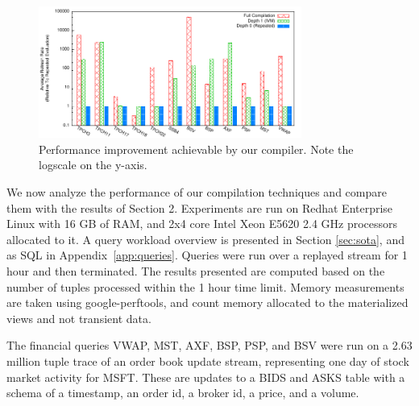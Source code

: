 
\newcommand{\figurewidth}[0]{1.8in}

\newcommand{\tablefig}[1]{
  \hspace*{-0.25in}
  \texttt{[image: ../graphs/graphs/\#1]}
}

\begin{figure}
\begin{center}
\includegraphics[width=3.4in]{../graphs/graphs/bakeoff.pdf}
\caption{Performance improvement achievable by our compiler.  Note the logscale on the y-axis. }
\label{fig:experiments:bakeoff}
\end{center}
\vspace*{-0.3in}
\end{figure}

We now analyze the performance of our compilation techniques and compare them with the results of Section 2.  Experiments are run on Redhat Enterprise Linux with 16 GB of RAM, and 2x4 core Intel Xeon E5620 2.4 GHz processors allocated to it.
A query workload overview is presented in Section \ref{sec:sota}, and as SQL in Appendix~\ref{app:queries}.
Queries were run over a replayed stream for 1 hour and then terminated. The results presented are computed based on the number of tuples processed within the 1 hour time limit.
Memory measurements are taken using google-perftools, and count memory allocated to the materialized views and not transient data.  

The financial queries VWAP, MST, AXF, BSP, PSP, and BSV were run on a 2.63 million tuple trace of an order book update stream, representing one day of stock market activity for MSFT.  These are updates to a BIDS and ASKS table with a schema of a timestamp, an order id, a broker id, a price, and a volume.

